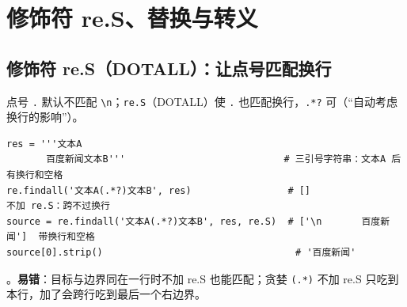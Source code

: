 \section{修饰符 re.S、替换与转义}

\subsection{修饰符 re.S（DOTALL）：让点号匹配换行}\label{sec:D06-reS}
点号 \texttt{.} 默认不匹配 \texttt{\textbackslash n}；\texttt{re.S}（DOTALL）使 \texttt{.} 也匹配换行，\texttt{.*?} 可（“自动考虑换行的影响”）。
\begin{lstlisting}[style=pyD06]
res = '''文本A
       百度新闻文本B'''                            # 三引号字符串：文本A 后有换行和空格
re.findall('文本A(.*?)文本B', res)                 # []                   不加 re.S：跨不过换行
source = re.findall('文本A(.*?)文本B', res, re.S)  # ['\n       百度新闻']  带换行和空格
source[0].strip()                                  # '百度新闻'
\end{lstlisting}
。\textbf{易错}：目标与边界同在一行时不加 re.S 也能匹配；贪婪 \texttt{(.*)} 不加 re.S 只吃到本行，加了会跨行吃到最后一个右边界。

